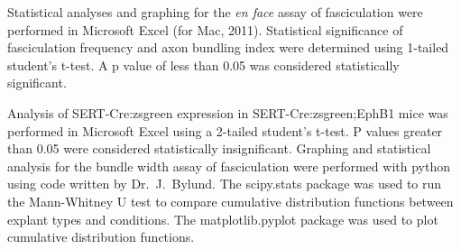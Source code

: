 Statistical analyses and graphing for the \emph{en face} assay of fasciculation were performed in Microsoft Excel (for Mac, 2011).
Statistical significance of fasciculation frequency and axon bundling index were determined using 1-tailed student's t-test.
A p value of less than 0.05 was considered statistically significant.

Analysis of SERT-Cre:zsgreen expression in SERT-Cre:zsgreen;EphB1 mice was performed in Microsoft Excel using a 2-tailed student's t-test.
P values greater than 0.05 were considered statistically insignificant.
Graphing and statistical analysis for the bundle width assay of fasciculation were performed with python using code written by Dr.~J.~Bylund.
The scipy.stats package was used to run the Mann-Whitney U test to compare cumulative distribution functions between explant types and conditions.
The matplotlib.pyplot package was used to plot cumulative distribution functions.
